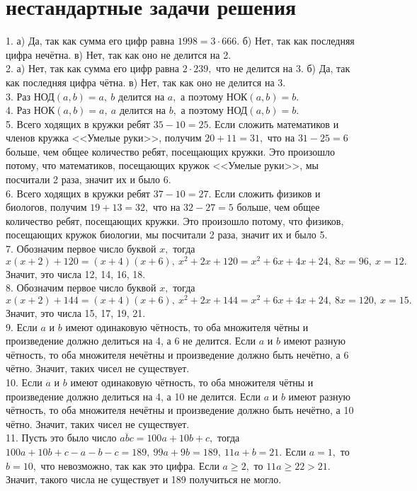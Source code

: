 \section{нестандартные задачи решения}
1. а) Да, так как сумма его цифр равна $1998=3\cdot666.$ б) Нет, так как последняя цифра нечётна. в) Нет, так как оно не делится на 2.\\
2. а) Нет, так как сумма его цифр равна $2\cdot239,$ что не делится на 3. б) Да, так как последняя цифра чётна. в) Нет, так как оно не делится на 3.\\
3. Раз $\text{НОД}(a,b)=a,\ b$ делится на $a,$  а поэтому  $\text{НОК}(a,b)=b.$\\
4. Раз $\text{НОК}(a,b)=a,\ a$ делится на $b,$  а поэтому  $\text{НОД}(a,b)=b.$\\
5. Всего ходящих в кружки ребят $35-10=25.$ Если сложить математиков и членов кружка <<Умелые руки>>, получим $20+11=31,$ что на $31-25=6$ больше, чем общее количество ребят, посещающих кружки. Это произошло потому, что математиков, посещающих кружок <<Умелые руки>>, мы посчитали 2 раза, значит их и было 6.\\
6. Всего ходящих в кружки ребят $37-10=27.$ Если сложить физиков и биологов, получим $19+13=32,$ что на $32-27=5$ больше, чем общее количество ребят, посещающих кружки. Это произошло потому, что физиков, посещающих кружок биологии, мы посчитали 2 раза, значит их и было 5.\\
7. Обозначим первое число буквой $x,$ тогда $x(x+2)+120=(x+4)(x+6),\ x^2+2x+120=x^2+6x+4x+24,\ 8x=96,\ x=12.$ Значит, это числа 12, 14, 16, 18.\\
8. Обозначим первое число буквой $x,$ тогда $x(x+2)+144=(x+4)(x+6),\ x^2+2x+144=x^2+6x+4x+24,\ 8x=120,\ x=15.$ Значит, это числа 15, 17, 19, 21.\\
9. Если $a$ и $b$ имеют одинаковую чётность, то оба множителя чётны и произведение должно делиться на 4, а 6 не делится. Если
$a$ и $b$ имеют разную чётность, то оба множителя нечётны и произведение должно быть нечётно, а 6 чётно. Значит, таких чисел не существует.\\
10. Если $a$ и $b$ имеют одинаковую чётность, то оба множителя чётны и произведение должно делиться на 4, а 10 не делится. Если
$a$ и $b$ имеют разную чётность, то оба множителя нечётны и произведение должно быть нечётно, а 10 чётно. Значит, таких чисел не существует.\\
11. Пусть это было число $\overline{abc}=100a+10b+c,$ тогда $100a+10b+c-a-b-c=189,\ 99a+9b=189,\ 11a+b=21.$ Если $a=1,$ то $b=10,$ что невозможно, так как это цифра. Если $a\geqslant2,$ то $11a\geqslant22>21.$ Значит, такого числа не существует и 189 получиться не могло.\\
